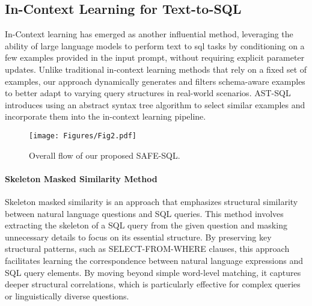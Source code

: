 \subsection{In-Context Learning for Text-to-SQL}
In-Context learning has emerged as another influential method, leveraging the ability of large language models to perform text to sql tasks by conditioning on a few examples provided in the input prompt, without requiring explicit parameter updates. 
Unlike traditional in-context learning methods that rely on a fixed set of examples, our approach dynamically generates and filters schema-aware examples to better adapt to varying query structures in real-world scenarios.
AST-SQL~\cite{ast} introduces using an abstract syntax tree algorithm to select similar examples and incorporate them into the in-context learning pipeline. 

\begin{figure*}[!ht]
\centerline{\texttt{[image: Figures/Fig2.pdf]}}
\caption{Overall flow of our proposed SAFE-SQL.}
\vspace{-4mm}
\label{fig:main}
\end{figure*}

\paragraph{Skeleton Masked Similarity Method}
Skeleton masked similarity is an approach that emphasizes structural similarity between natural language questions and SQL queries. This method involves extracting the skeleton of a SQL query from the given question and masking unnecessary details to focus on its essential structure.
By preserving key structural patterns, such as SELECT-FROM-WHERE clauses, this approach facilitates learning the correspondence between natural language expressions and SQL query elements. 
By moving beyond simple word-level matching, it captures deeper structural correlations, which is particularly effective for complex queries or linguistically diverse questions.


